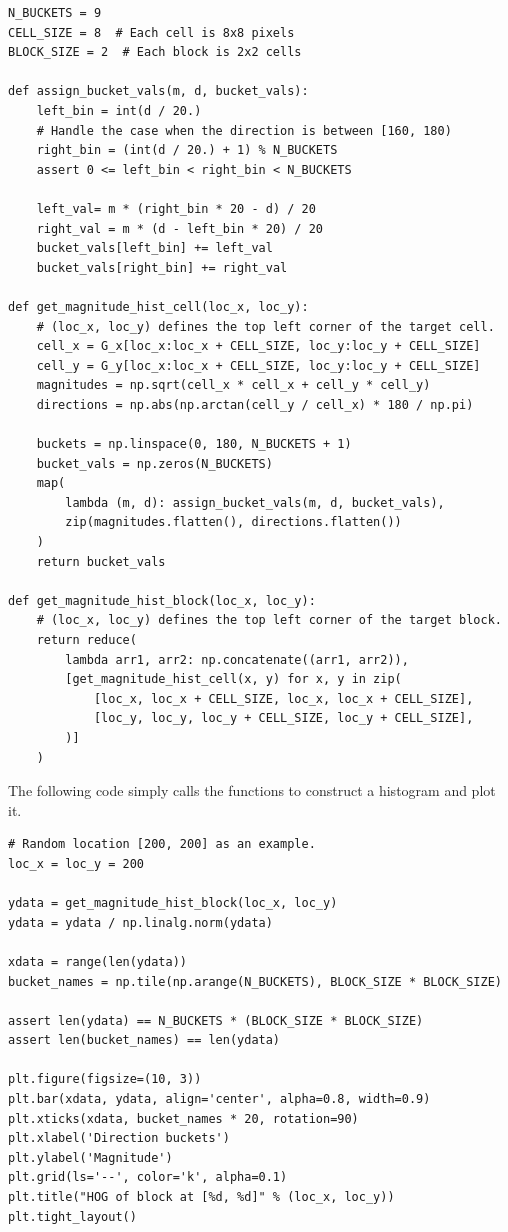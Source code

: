 \begin{verbatim}
N_BUCKETS = 9
CELL_SIZE = 8  # Each cell is 8x8 pixels
BLOCK_SIZE = 2  # Each block is 2x2 cells

def assign_bucket_vals(m, d, bucket_vals):
    left_bin = int(d / 20.)
    # Handle the case when the direction is between [160, 180)
    right_bin = (int(d / 20.) + 1) % N_BUCKETS
    assert 0 <= left_bin < right_bin < N_BUCKETS

    left_val= m * (right_bin * 20 - d) / 20
    right_val = m * (d - left_bin * 20) / 20
    bucket_vals[left_bin] += left_val
    bucket_vals[right_bin] += right_val

def get_magnitude_hist_cell(loc_x, loc_y):
    # (loc_x, loc_y) defines the top left corner of the target cell.
    cell_x = G_x[loc_x:loc_x + CELL_SIZE, loc_y:loc_y + CELL_SIZE]
    cell_y = G_y[loc_x:loc_x + CELL_SIZE, loc_y:loc_y + CELL_SIZE]
    magnitudes = np.sqrt(cell_x * cell_x + cell_y * cell_y)
    directions = np.abs(np.arctan(cell_y / cell_x) * 180 / np.pi)

    buckets = np.linspace(0, 180, N_BUCKETS + 1)
    bucket_vals = np.zeros(N_BUCKETS)
    map(
        lambda (m, d): assign_bucket_vals(m, d, bucket_vals), 
        zip(magnitudes.flatten(), directions.flatten())
    )
    return bucket_vals

def get_magnitude_hist_block(loc_x, loc_y):
    # (loc_x, loc_y) defines the top left corner of the target block.
    return reduce(
        lambda arr1, arr2: np.concatenate((arr1, arr2)),
        [get_magnitude_hist_cell(x, y) for x, y in zip(
            [loc_x, loc_x + CELL_SIZE, loc_x, loc_x + CELL_SIZE],
            [loc_y, loc_y, loc_y + CELL_SIZE, loc_y + CELL_SIZE],
        )]
    )
\end{verbatim}

The following code simply calls the functions to construct a histogram and plot it.

\begin{verbatim}
# Random location [200, 200] as an example.
loc_x = loc_y = 200

ydata = get_magnitude_hist_block(loc_x, loc_y)
ydata = ydata / np.linalg.norm(ydata)

xdata = range(len(ydata))
bucket_names = np.tile(np.arange(N_BUCKETS), BLOCK_SIZE * BLOCK_SIZE)

assert len(ydata) == N_BUCKETS * (BLOCK_SIZE * BLOCK_SIZE)
assert len(bucket_names) == len(ydata)

plt.figure(figsize=(10, 3))
plt.bar(xdata, ydata, align='center', alpha=0.8, width=0.9)
plt.xticks(xdata, bucket_names * 20, rotation=90)
plt.xlabel('Direction buckets')
plt.ylabel('Magnitude')
plt.grid(ls='--', color='k', alpha=0.1)
plt.title("HOG of block at [%d, %d]" % (loc_x, loc_y))
plt.tight_layout()
\end{verbatim}


